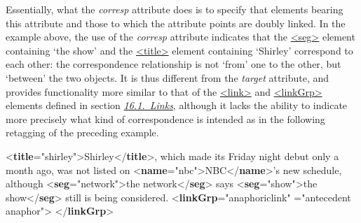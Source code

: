 Essentially, what the {\itshape corresp} attribute does is to specify that elements bearing this attribute and those to which the attribute points are doubly linked. In the example above, the use of the {\itshape corresp} attribute indicates that the \hyperref[TEI.seg]{<seg>} element containing ‘the show’ and the \hyperref[TEI.title]{<title>} element containing ‘Shirley’ correspond to each other: the correspondence relationship is not ‘from’ one to the other, but ‘between’ the two objects. It is thus different from the {\itshape target} attribute, and provides functionality more similar to that of the \hyperref[TEI.link]{<link>} and \hyperref[TEI.linkGrp]{<linkGrp>} elements defined in section \textit{\hyperref[SAPT]{16.1.\ Links}}, although it lacks the ability to indicate more precisely what kind of correspondence is intended as in the following retagging of the preceding example. \par\bgroup{}\exampleFont \begin{shaded}\noindent\mbox{}{<\textbf{title}\hspace*{1em}{xml:id}="{shirley}">}Shirley{</\textbf{title}>}, which made\mbox{}\newline 
 its Friday night debut only a month ago, was not\mbox{}\newline 
 listed on {<\textbf{name}\hspace*{1em}{xml:id}="{nbc}">}NBC{</\textbf{name}>}'s new schedule,\mbox{}\newline 
 although {<\textbf{seg}\hspace*{1em}{xml:id}="{network}">}the network{</\textbf{seg}>} says\mbox{}\newline 
{<\textbf{seg}\hspace*{1em}{xml:id}="{show}">}the show{</\textbf{seg}>} still is being considered.\mbox{}\newline 
\mbox{}\newline 
{<\textbf{linkGrp}\hspace*{1em}{type}="{anaphoric\textunderscore link}"\mbox{}\newline 
\hspace*{1em}{targFunc}="{antecedent anaphor}">}\mbox{}\newline 
{}\mbox{}\newline 
{}\mbox{}\newline 
{</\textbf{linkGrp}>}\end{shaded}\egroup\par \par

